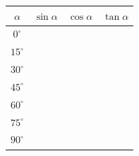 \documentclass[9pt]{exam}
\begin{document}
\newpage

\begin{center}
\LARGE
\begin{tabular}{|c|p{3cm}|p{3cm}|p{3cm}|}
\hline
\(\alpha\) & \(\sin \alpha\) & \(\cos \alpha\) & \(\tan \alpha\) \\
\hline
\(0^\circ\)   &               &               &               \\ \hline
\(15^\circ\)  &               &               &               \\ \hline
\(30^\circ\)  &               &               &               \\ \hline
\(45^\circ\)  &               &               &               \\ \hline
\(60^\circ\)  &               &               &               \\ \hline
\(75^\circ\)  &               &               &               \\ \hline
\(90^\circ\)  &               &               &               \\
\hline
\end{tabular}
\end{center}
\end{document}
